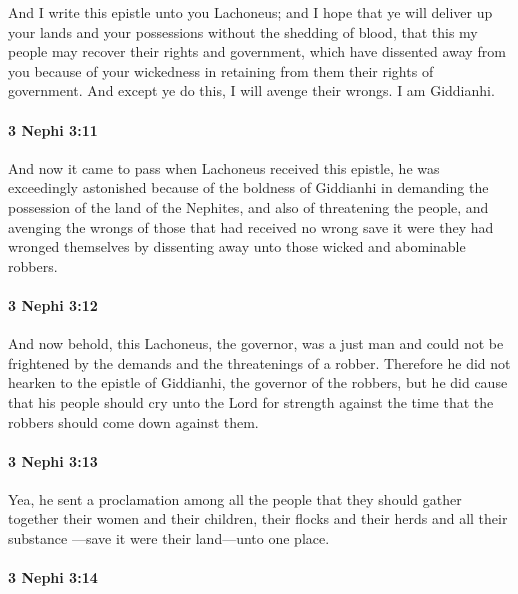 			And I write this epistle unto you Lachoneus;
			and I hope that ye will deliver up your lands and your possessions
			without the shedding of blood,
			that this my people may recover their rights and government,
			which have dissented away from you because of your wickedness
			in retaining from them their rights of government.
			And except ye do this, I will avenge their wrongs.
			I am Giddianhi.

		\paragraph{3 Nephi 3:11} %
			\label{3NEPHI-3-11}

			And now it came to pass when Lachoneus received this epistle,
			he was exceedingly astonished because of the boldness of Giddianhi
			in demanding the possession of the land of the Nephites,
			and also of threatening the people,
			and avenging the wrongs of those that had received no wrong
			save it were they had wronged themselves
			by dissenting away unto those wicked and abominable robbers.

		\paragraph{3 Nephi 3:12} %
			\label{3NEPHI-3-12}

			And now behold, this Lachoneus, the governor, was a just man
			and could not be frightened by the demands and the threatenings of a robber.
			Therefore he did not hearken to the epistle of Giddianhi, the governor of the robbers,
			but he did cause that his people should cry unto the Lord
			for strength against the time that the robbers should come down against them.

		\paragraph{3 Nephi 3:13} %
			\label{3NEPHI-3-13}

			Yea, he sent a proclamation among all the people
			that they should gather together their women and their children,
			their flocks and their herds and all their substance
			---save it were their land---unto one place.

		\paragraph{3 Nephi 3:14} %
			\label{3NEPHI-3-14}

